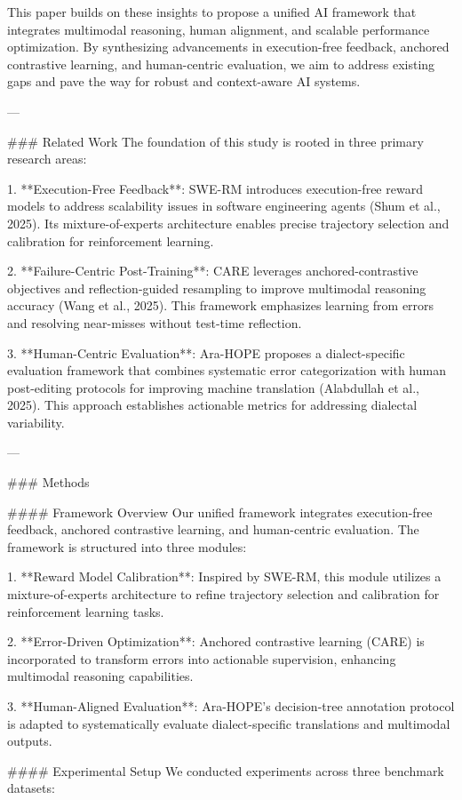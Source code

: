 This paper builds on these insights to propose a unified AI framework that integrates multimodal reasoning, human alignment, and scalable performance optimization. By synthesizing advancements in execution-free feedback, anchored contrastive learning, and human-centric evaluation, we aim to address existing gaps and pave the way for robust and context-aware AI systems.

---

### Related Work  
The foundation of this study is rooted in three primary research areas:

1. **Execution-Free Feedback**: SWE-RM introduces execution-free reward models to address scalability issues in software engineering agents (Shum et al., 2025). Its mixture-of-experts architecture enables precise trajectory selection and calibration for reinforcement learning.

2. **Failure-Centric Post-Training**: CARE leverages anchored-contrastive objectives and reflection-guided resampling to improve multimodal reasoning accuracy (Wang et al., 2025). This framework emphasizes learning from errors and resolving near-misses without test-time reflection.

3. **Human-Centric Evaluation**: Ara-HOPE proposes a dialect-specific evaluation framework that combines systematic error categorization with human post-editing protocols for improving machine translation (Alabdullah et al., 2025). This approach establishes actionable metrics for addressing dialectal variability.

---

### Methods  

#### Framework Overview  
Our unified framework integrates execution-free feedback, anchored contrastive learning, and human-centric evaluation. The framework is structured into three modules:

1. **Reward Model Calibration**: Inspired by SWE-RM, this module utilizes a mixture-of-experts architecture to refine trajectory selection and calibration for reinforcement learning tasks.

2. **Error-Driven Optimization**: Anchored contrastive learning (CARE) is incorporated to transform errors into actionable supervision, enhancing multimodal reasoning capabilities.

3. **Human-Aligned Evaluation**: Ara-HOPE's decision-tree annotation protocol is adapted to systematically evaluate dialect-specific translations and multimodal outputs.

#### Experimental Setup  
We conducted experiments across three benchmark datasets:

